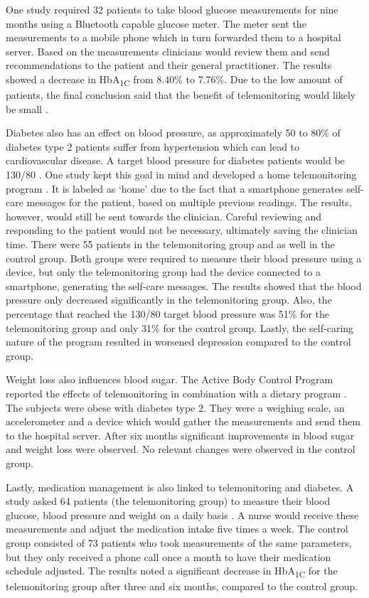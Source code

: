         One study required 32 patients to take blood glucose measurements for nine months using a Bluetooth capable glucose meter. The meter sent the measurements to a mobile phone which in turn forwarded them to a hospital server. Based on the measurements clinicians would review them and send recommendations to the patient and their general practitioner. The results showed a decrease in HbA\textsubscript{1C} from 8.40\% to 7.76\%. Due to the low amount of patients, the final conclusion said that the benefit of telemonitoring would likely be small \cite{istepanian2009evaluation}.

        Diabetes also has an effect on blood pressure, as approximately 50 to 80\% of diabetes type 2 patients suffer from hypertension which can lead to cardiovascular disease. A target blood pressure for diabetes patients would be 130/80 \cite{landsberg2004diabetes}. One study kept this goal in mind and developed a home telemonitoring program \cite{logan2012effect}. It is labeled as `home' due to the fact that a smartphone generates self-care messages for the patient, based on multiple previous readings. The results, however, would still be sent towards the clinician. Careful reviewing and responding to the patient would not be necessary, ultimately saving the clinician time. There were 55 patients in the telemonitoring group and as well in the control group. Both groups were required to measure their blood pressure using a device, but only the telemonitoring group had the device connected to a smartphone, generating the self-care messages. The results showed that the blood pressure only decreased significantly in the telemonitoring group. Also, the percentage that reached the 130/80 target blood pressure was 51\% for the telemonitoring group and only 31\% for the control group. Lastly, the self-caring nature of the program resulted in worsened depression compared to the control group.

        Weight loss also influences blood sugar. The Active Body Control Program reported the effects of telemonitoring in combination with a dietary program \cite{luley2011weight}. The subjects were obese with diabetes type 2. They were a weighing scale, an accelerometer and a device which would gather the measurements and send them to the hospital server. After six months significant improvements in blood sugar and weight loss were observed. No relevant changes were observed in the control group.

        Lastly, medication management is also linked to telemonitoring and diabetes. A study asked 64 patients (the telemonitoring group) to measure their blood glucose, blood pressure and weight on a daily basis \cite{stone2009active}. A nurse would receive these measurements and adjust the medication intake five times a week. The control group consisted of 73 patients who took measurements of the same parameters, but they only received a phone call once a month to have their medication schedule adjusted. The results noted a significant decrease in HbA\textsubscript{1C} for the telemonitoring group after three and six months, compared to the control group.

